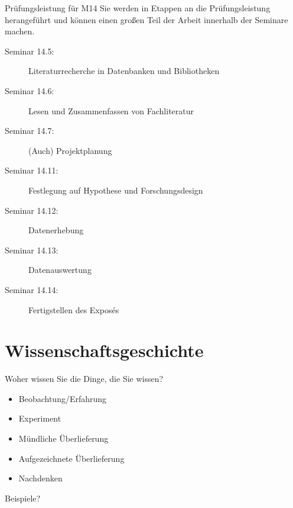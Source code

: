 \documentclass{beamer}
\begin{document}
\begin{frame}{Prüfungsleistung für M14}
Sie werden in Etappen an die Prüfungsleistung herangeführt und können einen großen Teil der Arbeit innerhalb der Seminare machen. \\[0.5 cm]

\begin{description}
    \item[Seminar 14.5:$\,$] Literaturrecherche in Datenbanken und Bibliotheken
    \item[Seminar 14.6:$\,$] Lesen und Zusammenfassen von Fachliteratur
    \item[Seminar 14.7:$\,$] (Auch) Projektplanung
    \item[Seminar 14.11:$\,$] Festlegung auf Hypothese und Forschungsdesign
    \item[Seminar 14.12:$\,$] Datenerhebung
    \item[Seminar 14.13:$\,$] Datenauswertung
    \item[Seminar 14.14:$\,$] Fertigstellen des Exposés
    
    
\end{description}

\end{frame}

\section{Wissenschaftsgeschichte}


\begin{frame}{Woher wissen Sie die Dinge, die Sie wissen?}
\pause
\begin{itemize}
\item 
Beobachtung/Erfahrung \\
\item 
Experiment \\
\item 
Mündliche Überlieferung \\
\item
Aufgezeichnete Überlieferung \\
\item 
Nachdenken \\

\end{itemize}
\vfill

\textcolor{theme}{Beispiele?}

\end{frame}
\end{document}
